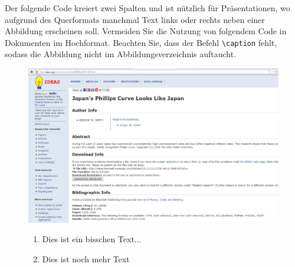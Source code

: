 \documentclass[a4paper,12pt]{scrartcl} %
\begin{document}
Der folgende Code kreiert zwei Spalten und ist nützlich für Präsentationen, wo aufgrund des Querformats manchmal Text links oder rechts neben einer Abbildung erscheinen soll. Vermeiden Sie die Nutzung von folgendem Code in Dokumenten im Hochformat. Beachten Sie, dass der Befehl \verb|\caption| fehlt, sodass die Abbildung nicht im Abbildungsverzeichnis auftaucht.

\begin{figure}[tbp!]
    \begin{minipage}{0.6\linewidth}
        \includegraphics[width=1.0\linewidth]{Ideas} %
    \end{minipage}
    \begin{minipage}{0.3\linewidth}
        \begin{enumerate} %
            \item Dies ist ein bisschen Text...
            \item Dies ist noch mehr Text
        \end{enumerate}
    \end{minipage}
\end{figure}

\clearpage
\end{document}
